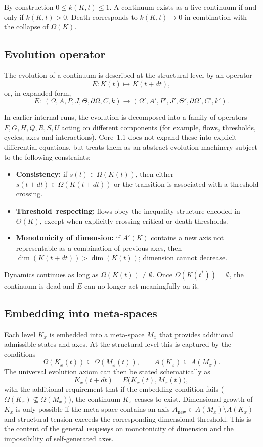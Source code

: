 By construction \(0 \le k(K,t) \le 1\).
A continuum exists as a live continuum if and only if \(k(K,t) > 0\).
Death corresponds to \(k(K,t)\to 0\) in combination with the collapse of \(\Omega(K)\).

\subsection{Evolution operator}

The evolution of a continuum is described at the structural level by an operator
\[
    E: K(t) \mapsto K(t+dt),
\]
or, in expanded form,
\[
    E:\ (\Omega,A,P,J,\Theta,\partial\Omega,C,k)
    \longrightarrow (\Omega',A',P',J',\Theta',\partial\Omega',C',k').
\]

In earlier internal runs, the evolution is decomposed into a family of operators \(F,G,H,Q,R,S,U\) acting on different components (for example, flows, thresholds, cycles, axes and interactions).
Core~1.1 does not expand these into explicit differential equations, but treats them as an abstract evolution machinery subject to the following constraints:

\begin{itemize}
    \item \textbf{Consistency:} if \(s(t) \in \Omega(K(t))\), then either \(s(t+dt) \in \Omega(K(t+dt))\) or the transition is associated with a threshold crossing.
    \item \textbf{Threshold–respecting:} flows obey the inequality structure encoded in \(\Theta(K)\), except when explicitly crossing critical or death thresholds.
    \item \textbf{Monotonicity of dimension:} if \(A'(K)\) contains a new axis not representable as a combination of previous axes, then \(\dim(K(t+dt)) > \dim(K(t))\); dimension cannot decrease.
\end{itemize}

Dynamics continues as long as \(\Omega(K(t)) \neq \emptyset\).
Once \(\Omega(K(t^\ast)) = \emptyset\), the continuum is dead and \(E\) can no longer act meaningfully on it.

\subsection{Embedding into meta-spaces}

Each level \(K_x\) is embedded into a meta-space \(M_x\) that provides additional admissible states and axes.
At the structural level this is captured by the conditions
\[
    \Omega(K_x(t)) \subseteq \Omega(M_x(t)), \qquad
    A(K_x) \subseteq A(M_x).
\]
The universal evolution axiom can then be stated schematically as
\[
    K_x(t+dt) = E\big(K_x(t), M_x(t)\big),
\]
with the additional requirement that if the embedding condition fails (\(\Omega(K_x)\not\subseteq\Omega(M_x)\)), the continuum \(K_x\) ceases to exist.
Dimensional growth of \(K_x\) is only possible if the meta-space contains an axis \(A_{\mathrm{new}}\in A(M_x)\setminus A(K_x)\) and structural tension exceeds the corresponding dimensional threshold.
This is the content of the general теоремуs on monotonicity of dimension and the impossibility of self-generated axes.


